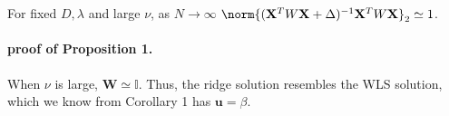 
    \begin{proposition}
        For fixed $D,\lambda$ and large $\nu$, as $N\rightarrow \infty$ $\norm{(\mathbf{X}^T W \mathbf{X} + \Delta)^{-1}\mathbf{X}^T W \mathbf{X}}_2 \simeq 1$.  
    \end{proposition}
    \paragraph{proof of Proposition 1.}
        When $\nu$ is large, $\mathbf{W} \simeq \mathbb{I}$. Thus, the ridge solution resembles the WLS solution, which we know from Corollary 1 has $\mathbf{u} = \beta$.

